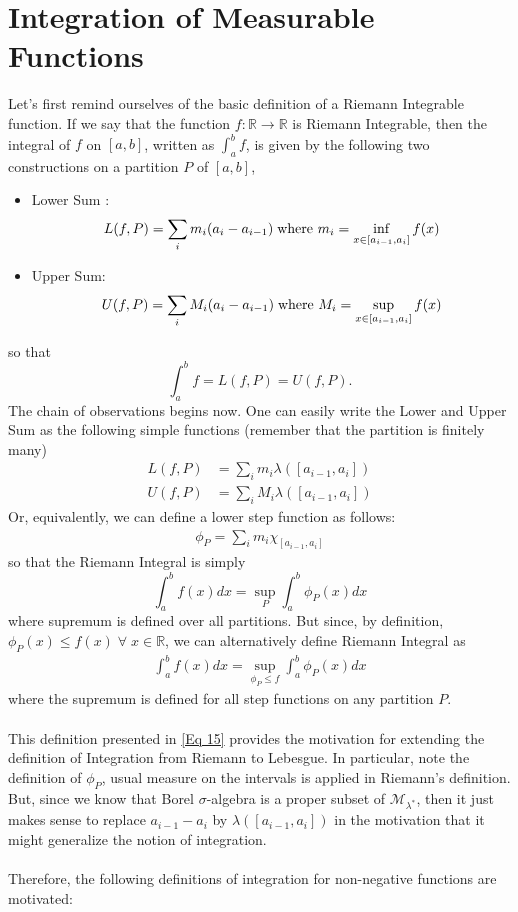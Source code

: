 \documentclass{article}
\theoremstyle{definition}
\theoremstyle{remark}
\theoremstyle{definition}
\theoremstyle{definition}
\theoremstyle{definition}
\newcommand{\R}{\mathbb{R}}
\newcommand{\set}[1]{\mathscr{#1}}
\newcommand{\msigm}[1]{\set{M}_{#1}}
\newcommand{\lm}[1]{\lambda\left (#1\right )}
\begin{document}
\section{Integration of Measurable Functions}
Let's first remind ourselves of the basic definition of a Riemann Integrable function. If we say that the function $ f : \R \to \R $ is Riemann Integrable, then the integral of $ f $ on $ [a,b] $, written as $ \int_a^{b} f $, is given by the following two constructions on a partition $ P $ of $ [a,b] $,
\begin{itemize}
	\item {Lower Sum :
	\[L(f,P) = \sum_i m_i (a_i - a_{i-1}) \;\text{where $ m_i = \inf_{x\in [a_{i-1},a_i] }f(x)  $}\]}
\item {Upper Sum:
\[U(f,P) = \sum_i M_i (a_i - a_{i-1}) \;\text{where $ M_i = \sup_{x\in [a_{i-1},a_i] }f(x)  $}\]
}
\end{itemize}
so that 
\[\int_a^{b} f = L(f,P) = U(f,P).\]
The chain of observations begins now. One can easily write the Lower and Upper Sum as the following simple functions (remember that the partition is finitely many) 
\begin{equation*}
	\begin{split}
		L(f,P) &= \sum_i m_i \lm{[a_{i-1},a_i]}\\
		U(f,P) &= \sum_i M_i \lm{[a_{i-1},a_i]}
	\end{split}
\end{equation*}
Or, equivalently, we can define a lower step function as follows:
\begin{equation*}
	\begin{split}
		\phi_P = \sum_i m_i \chi_{[a_{i-1},a_i]}
	\end{split}
\end{equation*}
so that the Riemann Integral is simply
\[\int_a^b f(x)dx = \sup_{P} \int_a^b \phi_P(x)dx\]
where supremum is defined over all partitions. But since, by definition, $ \phi_P(x) \le f(x) \;\forall\;x\in \R$, we can alternatively define Riemann Integral as
\begin{equation}\label{Eq 15}
	\begin{split}
		{\int_a^b f(x)dx = \sup_{\phi_P \le f} \int_a^b \phi_P(x)dx}
	\end{split}
\end{equation}
where the supremum is defined for all step functions on any partition $ P $.\\\\
 This definition presented in \eqref{Eq 15} provides the motivation for extending the definition of Integration from Riemann to Lebesgue. In particular, note the definition of $ \phi_P$, usual measure on the intervals is applied in Riemann's definition. But, since we know that Borel $ \sigma $-algebra is a proper subset of $ \msigm{\lambda^*} $, then it just makes sense to replace $ a_{i-1} - a_i $ by $ \lm{[a_{i-1},a_i]} $ in the motivation that it might generalize the notion of integration.\\\\
  Therefore, the following definitions of integration for non-negative functions are motivated:
 \newpage
\end{document}
